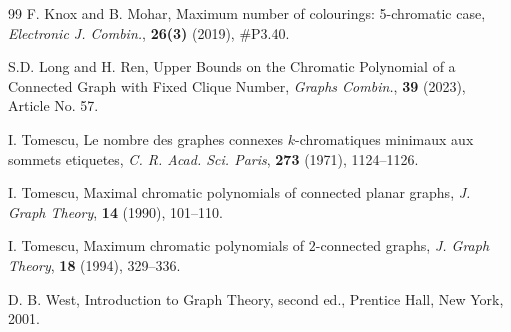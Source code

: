 \documentclass[12pt]{article}
\theoremstyle{definition}
\begin{document}
\begin{thebibliography}{99}
 F. Knox and B. Mohar, Maximum number of colourings: 5-chromatic case, \emph{Electronic J.
Combin.}, {\bf26(3)} (2019), \#P3.40.


  S.D. Long and H. Ren,  Upper Bounds on the Chromatic Polynomial of a Connected Graph with Fixed Clique Number, \emph{Graphs Combin.}, {\bf 39} (2023), Article No. 57.

 I. Tomescu, Le nombre des graphes connexes $k$-chromatiques minimaux aux sommets etiquetes,
\emph{C. R. Acad. Sci. Paris}, {\bf 273} (1971), 1124--1126.

 I. Tomescu, Maximal chromatic polynomials of connected planar graphs, \emph{J. Graph Theory}, {\bf 14} (1990), 101--110.

 I. Tomescu, Maximum chromatic polynomials of $2$-connected graphs, \emph{J. Graph Theory}, {\bf 18} (1994), 329--336.

 D. B. West, Introduction to Graph Theory, second ed., Prentice Hall, New York, 2001.




\end{thebibliography}

\end{document}
